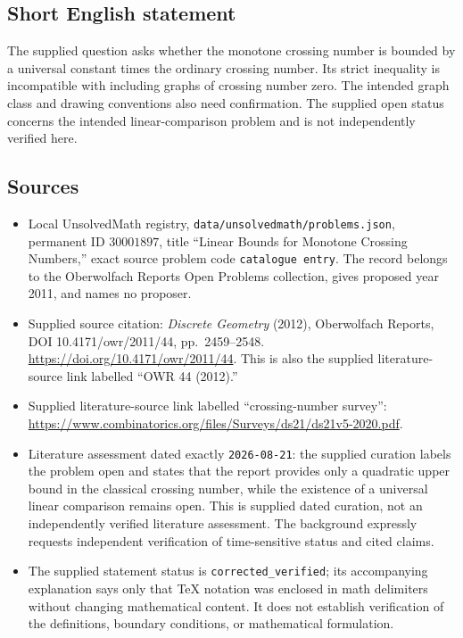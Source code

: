 \documentclass[11pt]{article}
\begin{document}
\subsection{Short English statement}
The supplied question asks whether the monotone crossing number is bounded by a universal constant times the ordinary crossing number. Its strict inequality is incompatible with including graphs of crossing number zero. The intended graph class and drawing conventions also need confirmation. The supplied open status concerns the intended linear-comparison problem and is not independently verified here.
\subsection{Sources}
\begin{itemize}
\item Local UnsolvedMath registry, \texttt{data/unsolvedmath/problems.json}, permanent ID \(30001897\), title ``Linear Bounds for Monotone Crossing Numbers,'' exact source problem code \texttt{catalogue entry}. The record belongs to the Oberwolfach Reports Open Problems collection, gives proposed year 2011, and names no proposer.
\item Supplied source citation: \emph{Discrete Geometry} (2012), Oberwolfach Reports, DOI 10.4171/owr/2011/44, pp.\ 2459--2548. \url{https://doi.org/10.4171/owr/2011/44}. This is also the supplied literature-source link labelled ``OWR 44 (2012).''
\item Supplied literature-source link labelled ``crossing-number survey'': \url{https://www.combinatorics.org/files/Surveys/ds21/ds21v5-2020.pdf}.
\item Literature assessment dated exactly \texttt{2026-08-21}: the supplied curation labels the problem open and states that the report provides only a quadratic upper bound in the classical crossing number, while the existence of a universal linear comparison remains open. This is supplied dated curation, not an independently verified literature assessment. The background expressly requests independent verification of time-sensitive status and cited claims.
\item The supplied statement status is \texttt{corrected\_verified}; its accompanying explanation says only that TeX notation was enclosed in math delimiters without changing mathematical content. It does not establish verification of the definitions, boundary conditions, or mathematical formulation.
\end{itemize}
\end{document}
